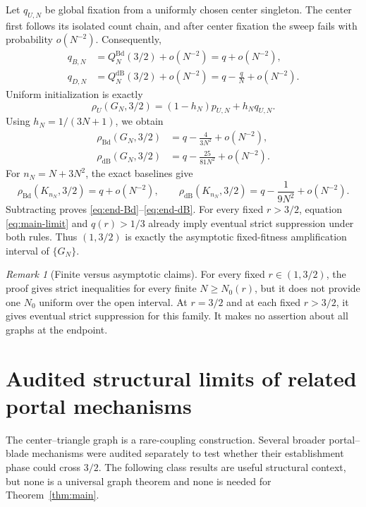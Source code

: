 \documentclass[11pt]{article}
\theoremstyle{definition}
\theoremstyle{remark}
\newtheorem{remark}[theorem]{Remark}
\newcommand{\Bd}{\mathrm{Bd}}
\newcommand{\dB}{\mathrm{dB}}
\begin{document}
Let $q_{U,N}$ be global fixation from a uniformly chosen center singleton.
The center first follows its isolated count chain, and after center fixation
the sweep fails with probability $o(N^{-2})$.  Consequently,
\begin{align}
 q_{B,N}&=Q_N^{\Bd}(3/2)+o(N^{-2})=q+o(N^{-2}),
 \label{eq:end-center-Bd}\\
 q_{D,N}&=Q_N^{\dB}(3/2)+o(N^{-2})
 =q-\frac{q}{N}+o(N^{-2}).
 \label{eq:end-center-dB}
\end{align}
Uniform initialization is exactly
\begin{equation}
 \rho_U(G_N,3/2)=(1-h_N)p_{U,N}+h_Nq_{U,N}.
 \label{eq:end-average}
\end{equation}
Using $h_N=1/(3N+1)$, we obtain
\begin{align}
 \rho_{\Bd}(G_N,3/2)
 &=q-\frac{4}{3N^2}+o(N^{-2}),\label{eq:end-graph-Bd}\\
 \rho_{\dB}(G_N,3/2)
 &=q-\frac{25}{81N^2}+o(N^{-2}).
 \label{eq:end-graph-dB}
\end{align}
For $n_N=N+3N^2$, the exact baselines give
\begin{equation}
 \rho_{\Bd}(K_{n_N},3/2)=q+o(N^{-2}),\qquad
 \rho_{\dB}(K_{n_N},3/2)=q-\frac1{9N^2}+o(N^{-2}).
 \label{eq:end-complete}
\end{equation}
Subtracting proves \eqref{eq:end-Bd}--\eqref{eq:end-dB}.  For every fixed
$r>3/2$, equation \eqref{eq:main-limit} and $q(r)>1/3$ already imply eventual
strict suppression under both rules.  Thus $(1,3/2)$ is exactly the
asymptotic fixed-fitness amplification interval of $\{G_N\}$.

\begin{remark}[Finite versus asymptotic claims]
For every fixed $r\in(1,3/2)$, the proof gives strict inequalities for every
finite $N\geq N_0(r)$, but it does not provide one $N_0$ uniform over the open
interval.  At $r=3/2$ and at each fixed $r>3/2$, it gives eventual strict
suppression for this family.  It makes no assertion about all graphs at the
endpoint.
\end{remark}

\section{Audited structural limits of related portal mechanisms}
\label{sec:portal-scope}

The center--triangle graph is a rare-coupling construction.  Several broader
portal--blade mechanisms were audited separately to test whether their
establishment phase could cross $3/2$.  The following class results are
useful structural context, but none is a universal graph theorem and none is
needed for Theorem~\ref{thm:main}.
\end{document}
